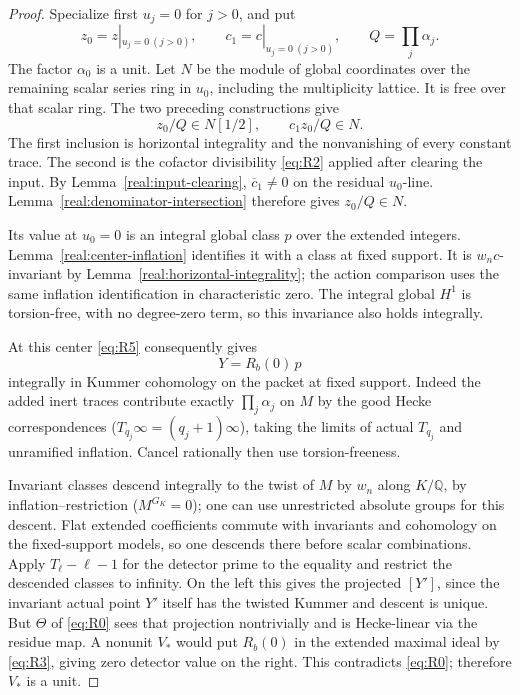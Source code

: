 \begin{proof}
Specialize first \(u_j=0\) for \(j>0\), and put
\[
 z_0=z|_{u_j=0\ (j>0)},\qquad
 c_1=c|_{u_j=0\ (j>0)},\qquad Q=\prod_j\alpha_j.
\]
The factor \(\alpha_0\) is a unit. Let \(N\) be the module of
global coordinates over the remaining scalar series ring in
\(u_0\), including the multiplicity lattice. It is free over that
scalar ring. The two preceding constructions give
\[
          z_0/Q\in N[1/2],\qquad c_1z_0/Q\in N.
\]
The first inclusion is horizontal integrality and the nonvanishing
of every constant trace. The second is the cofactor divisibility
\eqref{eq:R2} applied after clearing the input. By
Lemma~\ref{real:input-clearing}, \(\overline c_1\ne0\) on the
residual \(u_0\)-line. Lemma~\ref{real:denominator-intersection}
therefore gives \(z_0/Q\in N\).

Its value at \(u_0=0\) is an integral global class \(p\) over
the extended integers. Lemma~\ref{real:center-inflation} identifies
it with a class at fixed support. It is \(w_nc\)-invariant by
Lemma~\ref{real:horizontal-integrality}; the action comparison uses
the same inflation identification in characteristic zero. The
integral global \(H^1\) is torsion-free, with no degree-zero term,
so this invariance also holds integrally.

At this center \eqref{eq:R5} consequently gives
\[
                                 Y=R_b(0)\,p
\]
integrally in Kummer cohomology on the packet at fixed support. Indeed the added inert traces contribute exactly \(\prod_j\alpha_j\) on \(M\) by the good Hecke correspondences (\(T_{q_j}\infty=(q_j+1)\infty\)), taking the limits of actual \(T_{q_j}\) and unramified inflation. Cancel rationally then use torsion-freeness.

Invariant classes descend integrally to the twist of \(M\) by \(w_n\) along \(K/\mathbb Q\), by inflation--restriction (\(M^{G_K}=0\)); one can use unrestricted absolute groups for this descent. Flat extended coefficients commute with invariants and cohomology on the fixed-support models, so one descends there before scalar combinations. Apply \(T_\ell-\ell-1\) for the detector prime to the equality and restrict the descended classes to infinity. On the left this gives the projected \([Y']\), since the invariant actual point \(Y'\) itself has the twisted Kummer and descent is unique. But \(\Theta\) of \eqref{eq:R0} sees that projection nontrivially and is Hecke-linear via the residue map. A nonunit \(V_*\) would put \(R_b(0)\) in the extended maximal ideal by \eqref{eq:R3}, giving zero detector value on the right. This contradicts \eqref{eq:R0}; therefore \(V_*\) is a unit.
\end{proof}

